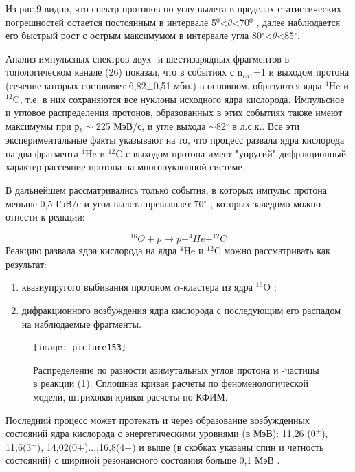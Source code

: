 \documentclass[fontsize=14pt]{scrreport}
\begin{document}
Из рис.9 видно, что спектр протонов по углу вылета в пределах статистических погрешностей остается постоянным в интервале 5$^{0}$<$\theta$<70$^{0}$ , далее наблюдается его быстрый рост с острым максимумом в интервале угла 80$^{\circ}$<$\theta$<85$^{\circ}$. 

Анализ импульсных спектров двух- и шестизарядных фрагментов в топологическом канале (26) показал, что в событиях с n$_{ch1}$=1 и выходом протона (сечение которых составляет 6,82$\pm$0,51 мбн.) в основном, образуются ядра $^{4}$He и $^{12}$C, т.е. в них сохраняются все нуклоны исходного ядра  кислорода. Импульсное и угловое распределения протонов, образованных в этих событиях также имеют максимумы при р$_{p}\sim$225 МэВ/с, и угле выхода $\sim$82$^{\circ}$ в л.с.к.. Все эти экспериментальные факты указывают на то, что процесс развала ядра кислорода на два фрагмента  $^{4}$He и $^{12}$C с выходом протона имеет "упругий" дифракционный характер  рассеяние протона на многонуклонной системе.

В дальнейшем рассматривались только события, в которых импульс протона меньше 0,5 ГэВ/с и угол вылета превышает 70$^{\circ}$ , которых заведомо можно отнести к реакции:

\begin{equation}
    ^{16}O+p\rightarrow p+^{4}He+^{12}C
    \label{equ1}
\end{equation}
Реакцию развала ядра кислорода на ядра $^{4}$He и $^{12}$C можно рассматривать как результат:
\begin{enumerate}
\item квазиупругого выбивания протоном $\alpha$-кластера из ядра $^{16}$O ;
\item дифракционного возбуждения ядра кислорода с последующим его распадом на наблюдаемые фрагменты.
\end{enumerate}


\begin{figure}
    \centering
    \texttt{[image: picture153]}
    \caption{Распределение по разности азимутальных углов протона и -частицы в реакции (1). Сплошная кривая  расчеты по феноменологической модели, штриховая кривая  расчеты по КФИМ.}
    \label{fig:153}
\end{figure}


Последний процесс может протекать и через образование возбужденных состояний ядра кислорода с энергетическими уровнями (в МэВ): 11,26 (0$^{+}$), 11,6(3$^{-}$), 14,02(0${+}$)...,16,8(4${+}$) и выше (в скобках указаны спин и четность состояний) с шириной резонансного состояния больше 0,1 МэВ \cite{13}.
\end{document}
